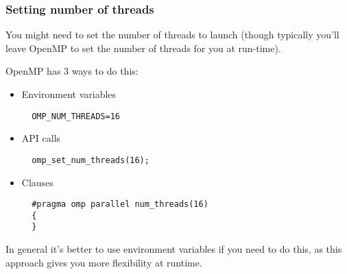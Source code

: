 \documentclass{beamer}
\begin{document}
%
%
%
%
%

\begin{frame}[fragile]
\frametitle{Setting number of threads}
You might need to set the number of threads to launch (though typically you'll leave OpenMP to set the number of threads for you at run-time).

OpenMP has 3 ways to do this:
\begin{itemize}
  \item Environment variables
  \begin{verbatim}
  OMP_NUM_THREADS=16
  \end{verbatim}

  \item API calls
  \begin{verbatim}
  omp_set_num_threads(16);
  \end{verbatim}

  \item Clauses
  \begin{verbatim}
  #pragma omp parallel num_threads(16)
  {
  }
  \end{verbatim}
\end{itemize}

In general it's better to use environment variables if you need to do this, as this approach gives you more flexibility at runtime.
\end{frame}
\end{document}
